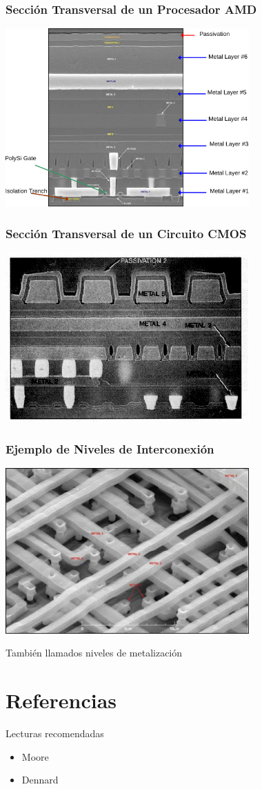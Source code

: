 \documentclass[t,aspectratio=169,10pt]{beamer}
\begin{document}
\begin{frame}
\frametitle{Sección Transversal de un Procesador AMD}
\centering \includegraphics[width=0.7\textwidth]{AMD}
\end{frame}


\begin{frame}
\frametitle{Sección Transversal de un Circuito CMOS}
\centering \includegraphics[width=0.7\textwidth]{CMOS-transv}
\end{frame}


\begin{frame}
\frametitle{Ejemplo de Niveles de Interconexión}
\centering \includegraphics[width=0.7\textwidth]{CMOS-interconnect}

También llamados niveles de metalización
\end{frame}


\section{Referencias}
\begin{frame}{Lecturas recomendadas}

\begin{itemize}
    \item Moore
    \item Dennard
\end{itemize}

\end{frame}
\end{document}
